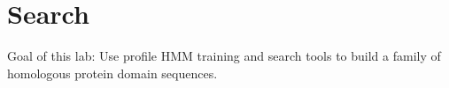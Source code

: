 \chapter{Search}

Goal of this lab:
Use profile HMM training and search tools to build a family of homologous protein domain sequences.

